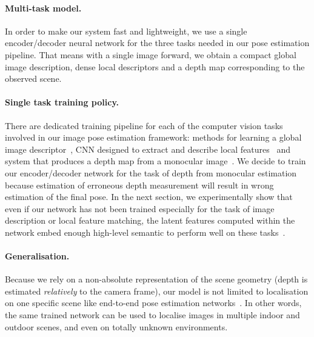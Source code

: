 \paragraph{Multi-task model.} In order to make our system fast and lightweight, we use a single encoder/decoder neural network for the three tasks needed in our pose estimation pipeline. That means with a single image forward, we obtain a compact global image description, dense local descriptors and a depth map corresponding to the observed scene.
\paragraph{Single task training policy.} There are dedicated training pipeline for each of the computer vision tasks involved in our image pose estimation framework: methods for learning a global image descriptor~\citep{Arandjelovic2017, Radenovic2017, Gordo2017}, CNN designed to extract and describe local features~\citep{Yi2016a, Rocco2018, Ono2018} and system that produces a depth map from a monocular image~\citep{Eigen2014, Godard2017, Mahjourian2018}. We decide to train our encoder/decoder network for the task of depth from monocular estimation because estimation of erroneous depth measurement will result in wrong estimation of the final pose. In the next section, we experimentally show that even if our network has not been trained especially for the task of image description or local feature matching, the latent features computed within the network embed enough high-level semantic to perform well on these tasks~\citep{Taira2018, Zamir2018}.
\paragraph{Generalisation.} Because we rely on a non-absolute representation of the scene geometry (depth is estimated \textit{relatively} to the camera frame), our model is not limited to localisation on one specific scene like end-to-end pose estimation networks~\citep{Kendall2017, Brachmann2017b}. In other words, the same trained network can be used to localise images in multiple indoor and outdoor scenes, and even on totally unknown environments. 